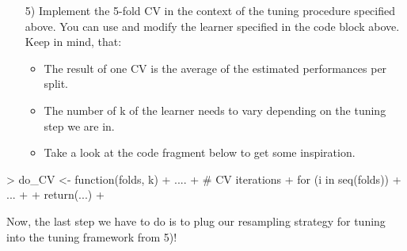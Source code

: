 \begin{enumerate}\bfseries
  \item[5)] Implement the 5-fold CV in the context of the tuning procedure
  specified above. You can use and modify the learner specified in the code
  block above. Keep in mind, that:
  \begin{itemize}
  \item The result of one CV is the average of the estimated performances
  per split.
  \item The number of k of the learner needs to vary depending on the tuning
  step we are in.
  \item Take a look at the code fragment below to get some inspiration.
  \end{itemize}
\end{enumerate}

\begin{Schunk}
\begin{Sinput}
> do_CV <- function(folds, k){
+   ....
+   # CV iterations
+   for (i in seq(folds)) {
+     ...
+   }
+   return(...)
+ }
\end{Sinput}
\end{Schunk}

Now, the last step we have to do is to plug our resampling strategy for tuning
into the tuning framework from 5)!
